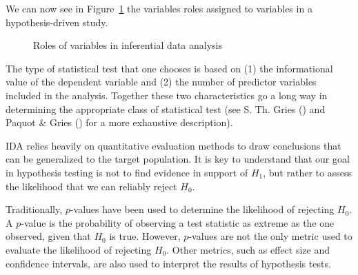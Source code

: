 \documentclass[
  letterpaper,
]{book}
\theoremstyle{definition}
\theoremstyle{remark}
\begin{document}
We can now see in Figure~\ref{fig-analysis-ida-variables} the variables
roles assigned to variables in a hypothesis-driven study.

\begin{figure}[!htb]


\caption{\label{fig-analysis-ida-variables}Roles of variables in
inferential data analysis}

\end{figure}%

The type of statistical test that one chooses is based on (1) the
informational value of the dependent variable and (2) the number of
predictor variables included in the analysis. Together these two
characteristics go a long way in determining the appropriate class of
statistical test (see S. Th. Gries () and
Paquot \& Gries () for a more exhaustive
description).

IDA relies heavily on quantitative evaluation methods to draw
conclusions that can be generalized to the target population. It is key
to understand that our goal in hypothesis testing is not to find
evidence in support of \(H_1\), but rather to assess the likelihood that
we can reliably reject \(H_0\).

Traditionally, \(p\)-values have been used to determine the likelihood
of rejecting \(H_0\). A \(p\)-value is the probability of observing a
test statistic as extreme as the one observed, given that \(H_0\) is
true. However, \(p\)-values are not the only metric used to evaluate the
likelihood of rejecting \(H_0\). Other metrics, such as effect size and
confidence intervals, are also used to interpret the results of
hypothesis tests.
\end{document}
